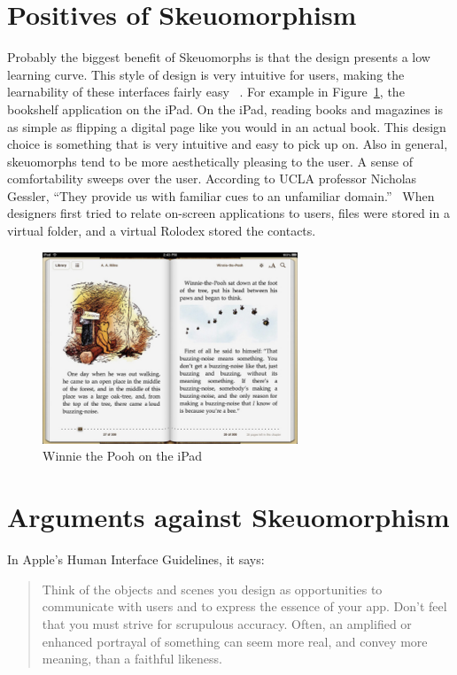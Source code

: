 \documentclass{article}
\begin{document}
\section{Positives of Skeuomorphism}

Probably the biggest benefit of Skeuomorphs is that the design presents a low learning curve. This style of design is very intuitive for users, making the learnability of these interfaces fairly easy ~\cite{Former-UI}. For example in Figure~\ref{book}, the bookshelf application on the iPad. On the iPad, reading books and magazines is as simple as flipping a digital page like you would in an actual book. This design choice is something that is very intuitive and easy to pick up on. Also in general, skeuomorphs tend to be more aesthetically pleasing to the user. A sense of comfortability sweeps over the user. According to UCLA professor Nicholas Gessler, “They provide us with familiar cues to an unfamiliar domain.”~\cite{Gessler} When designers first tried to relate on-screen applications to users, files were stored in a virtual folder, and a virtual Rolodex stored the contacts.~\cite{FastCompany3}
\begin{figure}
\centering
\includegraphics[width=3in]{ipadBook.jpeg} 

\caption{Winnie the Pooh on the iPad}
\label{book}
\end{figure}
\section{Arguments against Skeuomorphism}

In Apple’s Human Interface Guidelines, it says:

\begin{quote}Think of the objects and scenes you design as opportunities to communicate with users and to express the essence of your app. Don't feel that you must strive for scrupulous accuracy. Often, an amplified or enhanced portrayal of something can seem more real, and convey more meaning, than a faithful likeness.\end{quote}
\end{document}
